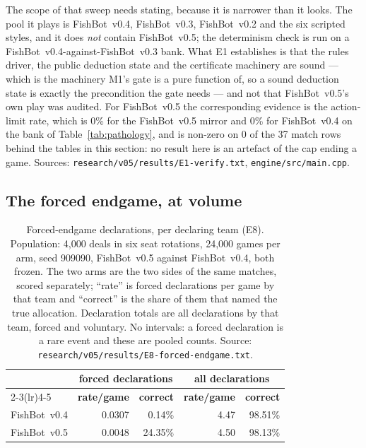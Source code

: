 \documentclass[11pt]{article}
\theoremstyle{definition}
\DeclareRobustCommand{\vfive}{\texorpdfstring{\mbox{FishBot v0.5}}{FishBot v0.5}}
\DeclareRobustCommand{\vfour}{\texorpdfstring{\mbox{FishBot v0.4}}{FishBot v0.4}}
\DeclareRobustCommand{\vthree}{\texorpdfstring{\mbox{FishBot v0.3}}{FishBot v0.3}}
\DeclareRobustCommand{\vtwo}{\texorpdfstring{\mbox{FishBot v0.2}}{FishBot v0.2}}
\providecommand{\numVfiveForcedAcc}{24.35}
\providecommand{\numVfourForcedAcc}{0.14}
\providecommand{\numForcedEightGames}{24{,}000}
\providecommand{\numForcedEightDeals}{4{,}000}
\providecommand{\numForcedEightSeed}{909090}
\providecommand{\numFiveCapRate}{0}
\providecommand{\numFourCapRate}{0}
\providecommand{\numVfiveDeclAccEight}{98.13}
\providecommand{\numVfiveDeclRateEight}{4.50}
\providecommand{\numVfiveForcedRate}{0.0048}
\providecommand{\numVfourDeclAccEight}{98.51}
\providecommand{\numVfourDeclRateEight}{4.47}
\providecommand{\numVfourForcedRate}{0.0307}
\providecommand{\numLimitRows}{37}
\providecommand{\numLimitNonzero}{0}
\begin{document}
The scope of that sweep needs stating, because it is narrower than it looks. The
pool it plays is \vfour{}, \vthree{}, \vtwo{} and the six scripted styles, and it
does \emph{not} contain \vfive{}; the determinism check is run on a
\vfour{}-against-\vthree{} bank. What E1 establishes is that the rules driver, the
public deduction state and the certificate machinery are sound --- which is the
machinery M1's gate is a pure function of, so a sound deduction state is exactly
the precondition the gate needs --- and not that \vfive{}'s own play was audited.
For \vfive{} the corresponding evidence is the action-limit rate, which is
\numFiveCapRate\% for the \vfive{} mirror and \numFourCapRate\% for \vfour{} on
the bank of Table~\ref{tab:pathology}, and is non-zero on \numLimitNonzero{} of
the \numLimitRows{} match rows behind the tables in this section: no result here
is an artefact of the cap ending a game. Sources:
\texttt{research/v05/results/E1-verify.txt}, \texttt{engine/src/main.cpp}.

\subsection{The forced endgame, at volume}
\label{sec:results-forced}

\begin{table}[t]
\centering
\caption{Forced-endgame declarations, per declaring team (E8). Population:
\numForcedEightDeals{} deals in six seat rotations, \numForcedEightGames{} games
per arm, seed \numForcedEightSeed{}, \vfive{} against \vfour{}, both frozen. The
two arms are the two sides of the same matches, scored separately; ``rate'' is
forced declarations per game by that team and ``correct'' is the share of them
that named the true allocation. Declaration totals are all declarations by that
team, forced and voluntary. No intervals: a forced declaration is a rare event
and these are pooled counts. Source:
\texttt{research/v05/results/E8-forced-endgame.txt}.}
\label{tab:forced}
\small
\begin{tabular}{lrrrr}
\toprule
& \multicolumn{2}{c}{\textbf{forced declarations}} & \multicolumn{2}{c}{\textbf{all declarations}} \\
\cmidrule(lr){2-3}\cmidrule(lr){4-5}
& \textbf{rate/game} & \textbf{correct} & \textbf{rate/game} & \textbf{correct} \\
\midrule
\vfour{} & \numVfourForcedRate{} & \numVfourForcedAcc\% & \numVfourDeclRateEight{} & \numVfourDeclAccEight\% \\
\vfive{} & \numVfiveForcedRate{} & \numVfiveForcedAcc\% & \numVfiveDeclRateEight{} & \numVfiveDeclAccEight\% \\
\bottomrule
\end{tabular}
\end{table}
\end{document}
